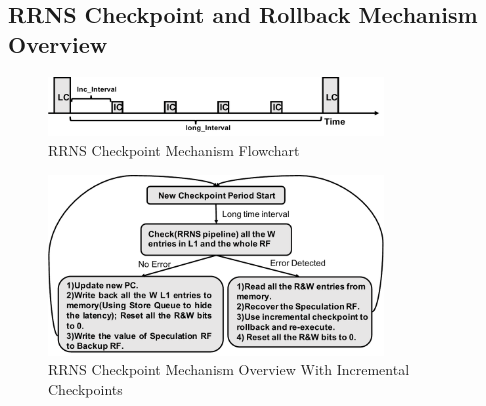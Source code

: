 \documentclass{sig-alternate}
\begin{document}
\subsection{RRNS Checkpoint and Rollback Mechanism Overview}
\begin{figure}[H]
\centering
\includegraphics[width=3.5in]{graphics/chpt_overview.pdf}

\caption{RRNS Checkpoint Mechanism Flowchart}
\label{fig_chpt_overview}
\end{figure}

\begin{figure}[H]
\centering
\includegraphics[width=3.5in]{graphics/chpt_flowchart.pdf}

\caption{RRNS Checkpoint Mechanism Overview With Incremental Checkpoints}
\label{fig_chpt_flowchart}
\end{figure}
\end{document}
